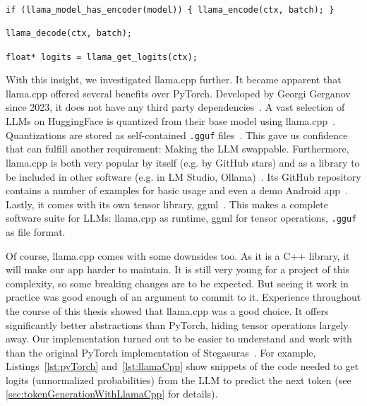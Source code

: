 \begin{lstlisting}[caption={[llama.cpp]{Snippet of our code needed to get logits from a \gls{LLM} using llama.cpp. No tensor operations are exposed.}}, label={lst:llamaCpp}]
if (llama_model_has_encoder(model)) { llama_encode(ctx, batch); }

llama_decode(ctx, batch);

float* logits = llama_get_logits(ctx);
\end{lstlisting}

With this insight, we investigated llama.cpp further. It became apparent that llama.cpp offered several benefits over PyTorch. Developed by Georgi Gerganov since 2023, it does not have any third party dependencies~\cite{gerganovGgerganovLlamacpp2024}. A vast selection of \glspl{LLM} on HuggingFace is quantized from their base model using llama.cpp~\cite{huggingfaceModelsHuggingFace2025}. Quantizations are stored as self-contained \lstinline|.gguf| files~\cite{huggingfaceGGUF}. This gave us confidence that can fulfill another requirement: Making the \gls{LLM} swappable. Furthermore, llama.cpp is both very popular by itself (e.g. by GitHub stars) and as a library to be included in other software (e.g. in LM Studio, Ollama)~\cite{gerganovGgerganovLlamacpp2024}. Its GitHub repository contains a number of examples for basic usage and even a demo Android app~\cite{gerganovGgerganovLlamacpp2024}. Lastly, it comes with its own tensor library, ggml~\cite{gerganovGgerganovGgml2024}. This makes a complete software suite for \glspl{LLM}: llama.cpp as runtime, ggml for tensor operations, \lstinline|.gguf| as file format.

Of course, llama.cpp comes with some downsides too. As it is a C++ library, it will make our app harder to maintain. It is still very young for a project of this complexity, so some breaking changes are to be expected. But seeing it work in practice was good enough of an argument to commit to it. Experience throughout the course of this thesis showed that llama.cpp was a good choice. It offers significantly better abstractions than PyTorch, hiding tensor operations largely away. Our implementation turned out to be easier to understand and work with than the original PyTorch implementation of Stegasuras~\cite{zieglerHarvardnlpNeuralSteganography2025}. For example, Listings~\ref{lst:pyTorch} and~\ref{lst:llamaCpp} show snippets of the code needed to get logits (unnormalized probabilities) from the \gls{LLM} to predict the next token (see \cref{sec:tokenGenerationWithLlamaCpp} for details).

